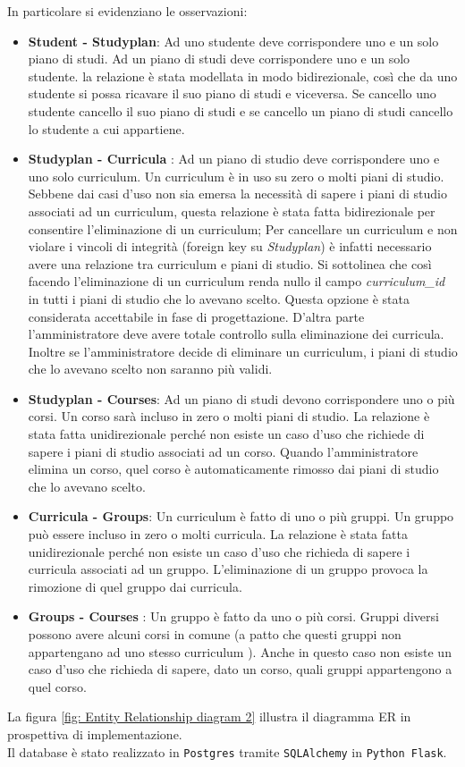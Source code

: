 \documentclass{article}
\begin{document}
In particolare si evidenziano le osservazioni:
\begin{itemize}
\item \textbf{Student - Studyplan}: Ad uno studente deve corrispondere uno e un solo piano di studi. Ad un piano di studi deve corrispondere uno e un solo studente. la relazione è stata modellata in modo bidirezionale, così che da uno studente si possa ricavare il suo piano di studi e viceversa. Se cancello uno studente  cancello il suo piano di studi e se cancello un piano di studi cancello lo studente a cui appartiene.
\item \textbf{Studyplan - Curricula }: Ad un piano di studio deve corrispondere uno e uno solo curriculum. Un curriculum è in uso su zero o molti piani di studio. Sebbene dai casi d'uso non sia emersa la necessità di sapere i piani di studio associati ad un curriculum, questa relazione è stata fatta bidirezionale per consentire l'eliminazione di un curriculum; Per cancellare un curriculum e non violare i vincoli di integrità  (foreign key su \emph{Studyplan}) è infatti necessario avere una relazione tra curriculum e piani di studio. Si sottolinea che così facendo l'eliminazione di un curriculum renda nullo il campo \emph{curriculum\_id} in tutti i piani di studio che lo avevano scelto. Questa opzione è stata considerata accettabile in fase di progettazione. D'altra parte l'amministratore deve avere totale controllo sulla eliminazione dei curricula. Inoltre se l'amministratore decide di eliminare un curriculum, i piani di studio che lo avevano scelto non saranno più validi.
\item \textbf{Studyplan - Courses}:  Ad un piano di studi devono corrispondere uno o più corsi. Un corso sarà incluso in zero o molti piani di studio.  La relazione è stata fatta unidirezionale perché non esiste un caso d'uso che richiede di sapere i piani di studio associati ad un corso. Quando l'amministratore elimina un corso, quel corso è automaticamente rimosso dai piani di studio che lo  avevano scelto.
\item \textbf{Curricula - Groups}: Un curriculum è fatto di uno o più gruppi. Un gruppo può essere incluso in zero o molti curricula. La relazione è stata fatta unidirezionale perché non esiste un caso d'uso che richieda di sapere i curricula associati ad un gruppo. L'eliminazione di un gruppo provoca la rimozione di quel gruppo dai curricula.
\item \textbf{Groups - Courses }: Un gruppo è fatto da uno o più corsi. Gruppi diversi possono avere alcuni corsi in comune (a patto che questi gruppi non appartengano ad uno stesso curriculum ). Anche in questo caso non esiste un caso d'uso che richieda di sapere, dato un corso, quali gruppi appartengono a quel corso.
\end{itemize}
La figura \ref{fig: Entity Relationship diagram 2} illustra il diagramma ER in prospettiva di implementazione.\\
Il database è stato realizzato in \texttt{Postgres} tramite \texttt{SQLAlchemy} in \texttt{Python Flask}.
\end{document}

